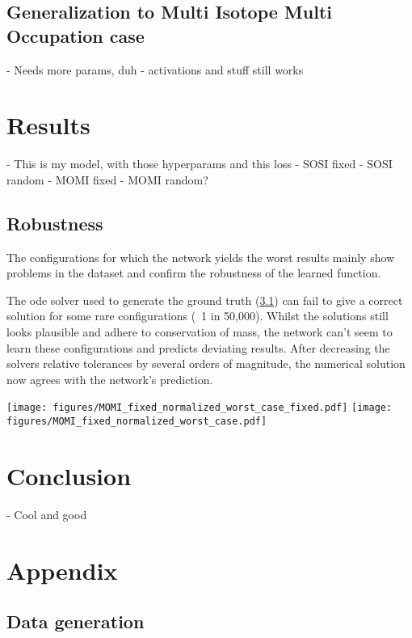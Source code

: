 \subsection{Generalization to Multi Isotope Multi Occupation case}
- Needs more params, duh
- activations and stuff still works

\section{Results}
- This is my model, with those hyperparams and this loss
- SOSI fixed
- SOSI random
- MOMI fixed
- MOMI random?
\subsection{Robustness}
The configurations for which the network yields the worst results mainly show problems in the dataset and confirm the robustness of the learned function.

The ode solver used to generate the ground truth (\ref{data}) can fail to give a correct solution for some rare configurations (~1 in 50,000). 
Whilst the solutions still looks plausible and adhere to conservation of mass, the network can't seem to learn these configurations and predicts deviating results.
After decreasing the solvers relative tolerances by several orders of magnitude, the numerical solution now agrees with the network's prediction.

\texttt{[image: figures/MOMI\_fixed\_normalized\_worst\_case\_fixed.pdf]}
\texttt{[image: figures/MOMI\_fixed\_normalized\_worst\_case.pdf]}
\section{Conclusion}
- Cool and good

\section{Appendix}
\subsection{Data generation}\label{data}



